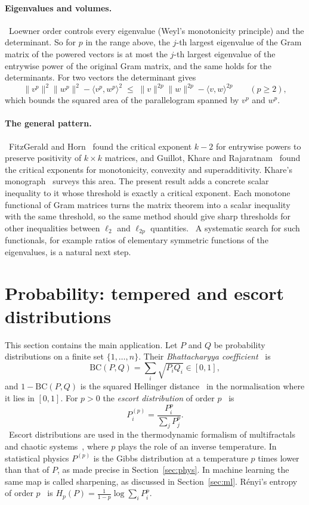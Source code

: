 \documentclass[11pt]{article}
\theoremstyle{remark}
\newcommand{\ip}[2]{\langle #1,#2\rangle}
\newcommand{\BC}{\mathrm{BC}}
\newcommand{\claimtag}[2]{\tcbox[on line,boxsep=1pt,left=3pt,right=3pt,top=0pt,bottom=0pt,colback=#1!10,colframe=#1!70,boxrule=0.4pt,arc=1.5pt]{\sffamily\scriptsize\bfseries\color{#1}#2}}
\newcommand{\context}{\claimtag{navy}{CONTEXT}}
\newcommand{\consequence}{\claimtag{ForestGreen}{PROVED HERE}}
\newcommand{\proposal}{\claimtag{accent}{PROPOSAL}}
\begin{document}
\paragraph{Eigenvalues and volumes.} \consequence\ Loewner order controls every eigenvalue (Weyl's monotonicity principle) and the determinant. So for $p$ in the range above, the $j$-th largest eigenvalue of the Gram matrix of the powered vectors is at most the $j$-th largest eigenvalue of the entrywise power of the original Gram matrix, and the same holds for the determinants. For two vectors the determinant gives
\[
\|v^p\|^2\|w^p\|^2-\ip{v^p}{w^p}^2\;\le\;\|v\|^{2p}\|w\|^{2p}-\ip vw^{2p}\qquad(p\ge2),
\]
which bounds the squared area of the parallelogram spanned by $v^p$ and $w^p$.

\paragraph{The general pattern.} \context\ FitzGerald and Horn~\cite{FH} found the critical exponent $k-2$ for entrywise powers to preserve positivity of $k\times k$ matrices, and Guillot, Khare and Rajaratnam~\cite{GKR15} found the critical exponents for monotonicity, convexity and superadditivity. Khare's monograph~\cite{Khare} surveys this area. The present result adds a concrete scalar inequality to it whose threshold is exactly a critical exponent. Each monotone functional of Gram matrices turns the matrix theorem into a scalar inequality with the same threshold, so the same method should give sharp thresholds for other inequalities between $\ell_2$ and $\ell_{2p}$ quantities. \proposal\ A systematic search for such functionals, for example ratios of elementary symmetric functions of the eigenvalues, is a natural next step.

\section{Probability: tempered and escort distributions}\label{sec:prob}

This section contains the main application. Let $P$ and $Q$ be probability distributions on a finite set $\{1,\dots,n\}$. Their \emph{Bhattacharyya coefficient}~\cite{Bhattacharyya} is
\[
\BC(P,Q)=\sum_i\sqrt{P_iQ_i}\in[0,1],
\]
and $1-\BC(P,Q)$ is the squared Hellinger distance~\cite{Hellinger} in the normalisation where it lies in $[0,1]$. For $p>0$ the \emph{escort distribution} of order $p$~\cite{BeckSchlogl} is
\[
P^{(p)}_i=\frac{P_i^p}{\sum_jP_j^p}.
\]
\context\ Escort distributions are used in the thermodynamic formalism of multifractals and chaotic systems~\cite{BeckSchlogl}, where $p$ plays the role of an inverse temperature. In statistical physics $P^{(p)}$ is the Gibbs distribution at a temperature $p$ times lower than that of $P$, as made precise in Section~\ref{sec:phys}. In machine learning the same map is called sharpening, as discussed in Section~\ref{sec:ml}. Rényi's entropy of order $p$~\cite{Renyi} is $H_p(P)=\frac1{1-p}\log\sum_iP_i^p$.
\end{document}
